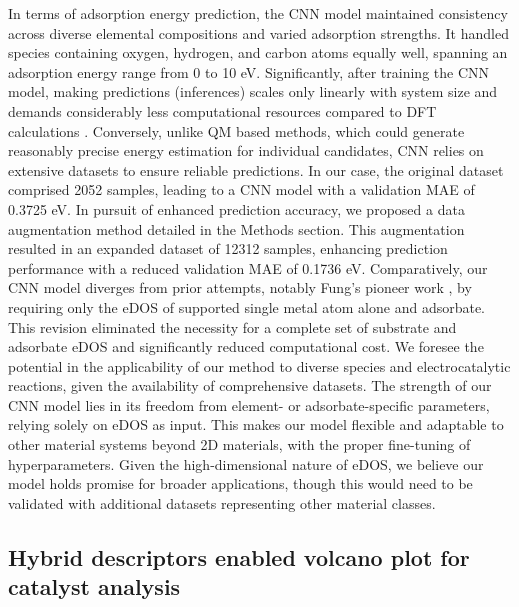     In terms of adsorption energy prediction, the CNN model maintained consistency across diverse elemental compositions and varied adsorption strengths.
    It handled species containing oxygen, hydrogen, and carbon atoms equally well, spanning an adsorption energy range from 0 to 10 eV.
    Significantly, after training the CNN model, making predictions (inferences) scales only linearly with system size and demands considerably less computational resources compared to DFT calculations \cite{chandrasekaran2019solving}.
    Conversely, unlike QM based methods, which could generate reasonably precise energy estimation for individual candidates, CNN relies on extensive datasets to ensure reliable predictions.
    In our case, the original dataset comprised 2052 samples, leading to a CNN model with a validation MAE of 0.3725 eV.
    In pursuit of enhanced prediction accuracy, we proposed a data augmentation method detailed in the Methods section.
    This augmentation resulted in an expanded dataset of 12312 samples, enhancing prediction performance with a reduced validation MAE of 0.1736 eV.
    Comparatively, our CNN model diverges from prior attempts, notably Fung's pioneer work \cite{fung2021machine}, by requiring only the eDOS of supported single metal atom alone and adsorbate.
    This revision eliminated the necessity for a complete set of substrate and adsorbate eDOS and significantly reduced computational cost.
    We foresee the potential in the applicability of our method to diverse species and electrocatalytic reactions, given the availability of comprehensive datasets.
    The strength of our CNN model lies in its freedom from element- or adsorbate-specific parameters, relying solely on eDOS as input.
    This makes our model flexible and adaptable to other material systems beyond 2D materials, with the proper fine-tuning of hyperparameters.
    Given the high-dimensional nature of eDOS, we believe our model holds promise for broader applications, though this would need to be validated with additional datasets representing other material classes.


\subsection{Hybrid descriptors enabled volcano plot for catalyst analysis}

